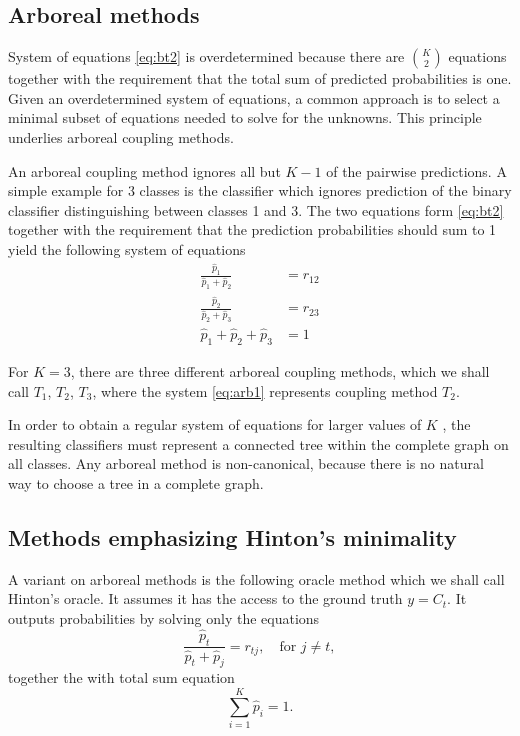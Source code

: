 \documentclass[twoside,11pt]{article}
\begin{document}
\subsection{Arboreal methods}

System of equations \eqref{eq:bt2} is overdetermined because there are $\binom{K}{2}$ equations together with the requirement that the total sum of predicted probabilities is one.  Given an overdetermined system of equations, a common approach is to select a minimal subset of equations needed to solve for the unknowns. This principle underlies arboreal coupling methods.

An arboreal coupling method ignores all but $K-1$ of the pairwise predictions. A simple example for 3 classes is the classifier which ignores prediction of the binary classifier distinguishing between classes 1 and 3. The two equations form \eqref{eq:bt2} together with the requirement that the prediction probabilities should sum to 1 yield the following system of equations
\begin{equation}
	\begin{split}
		\frac{\hat p_1}{\hat p_1 + \hat p_2} &= {r}_{12}\\
		\frac{\hat p_2}{\hat p_2 + \hat p_3} &= {r}_{23}\\
		\hat p_1 + \hat p_2 + \hat p_3 &= 1
	\end{split}
	\label{eq:arb1}
\end{equation}

For $K=3$, there are three different arboreal coupling methods, which we shall call $T_1$, $T_2$, $T_3$, where the system \eqref{eq:arb1} represents coupling method $T_2$.

In order to obtain a regular system of equations for  larger values of $K$ , the resulting classifiers must represent a connected tree within the complete graph on all classes. Any arboreal method is non-canonical, because there is no natural way to choose a tree in a complete graph.

\subsection{Methods emphasizing Hinton's minimality}

A variant on arboreal methods is the following oracle method which we shall call Hinton's oracle. It  assumes it has the access to the ground truth $y = C_t$. It outputs probabilities by solving only the equations
$$
\frac{\hat p_t}{\hat p_t + \hat p_j} = {r}_{tj},\quad \textrm{for }j\not = t,
$$
together the  with total sum equation
$$
\sum_{i=1}^K  \hat p_i = 1.
$$
\end{document}
